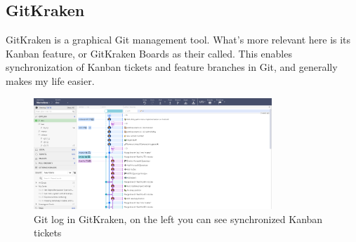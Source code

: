 \subsection*{GitKraken}\label{chap:gitkraken}
GitKraken is a graphical Git management tool. What's more relevant here is its Kanban feature, or GitKraken Boards as their called. This enables synchronization of Kanban tickets and feature branches in Git, and generally makes my life easier.
\begin{figure}[ht]
    \centering
    \includegraphics[width=0.8\textwidth]{fig/gitkraken}
    \caption{Git log in GitKraken, on the left you can see synchronized Kanban tickets}
\end{figure}







